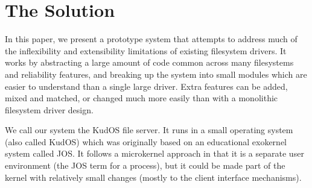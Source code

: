 \section{The Solution}
\label{sec:solution}

In this paper, we present a prototype system that attempts to address much of
the inflexibility and extensibility limitations of existing filesystem drivers.
It works by abstracting a large amount of code common across many filesystems
and reliability features, and breaking up the system into small modules which
are easier to understand than a single large driver. Extra features can be
added, mixed and matched, or changed much more easily than with a monolithic
filesystem driver design.

We call our system the KudOS file server. It runs in a small operating system
(also called KudOS) which was originally based on an educational exokernel
system called JOS. It follows a microkernel approach in that it is a separate
user environment (the JOS term for a process), but it could be made part of the
kernel with relatively small changes (mostly to the client interface
mechanisms).



